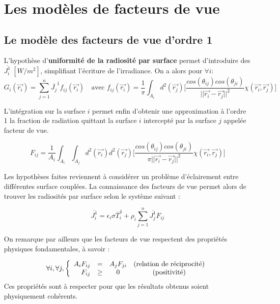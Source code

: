 \section{Les modèles de facteurs de vue}

\subsection{Le modèle des facteurs de vue d'ordre 1}
L'hypothèse d'\textbf{uniformité de la radiosité par surface} permet d'introduire des $\overline{J_i^1} \; [W/m^2]$, simplifiant l'écriture de l'irradiance. On a alors pour $\forall i$:
\begin{equation}
    G_i(\vec{r_i}) = \sum_{j = 1}^{n} \overline{J_j}^1 f_{ij}(\vec{r_i}) \quad \text{avec } f_{ij}(\vec{r_i}) =\frac{1}{\pi} \int_{A_i} d^2(\vec{r_j})\bigg[\frac{cos(\theta_{ij})cos(\theta_{ji})}{||\vec{r_i}-\vec{r_j}||^2} \chi{(\vec{r_i},\vec{r_j})}\bigg] 
\end{equation}

L'intégration sur la surface $i$ permet enfin d'obtenir une approximation à l'ordre 1 la fraction de radiation quittant la surface $i$ intercepté par la surface $j$ appelée facteur de vue.

\begin{equation}
    \label{fv}
    F_{ij} = \frac{1}{A_i} \int_{A_i} \int_{A_j} d^2(\vec{r_i}) d^2(\vec{r_j})\bigg[\frac{cos(\theta_{ij})cos(\theta_{ji})}{\pi ||\vec{r_i}-\vec{r_j}||^2} \chi(\vec{r_i},\vec{r_j})\bigg] 
\end{equation}


Les hypothèses faites reviennent à considérer un problème d'éclairement entre différentes surface couplées. La connaissance des facteurs de vue permet alors de trouver les radiosités par surface selon le système suivant : 

\begin{equation}
    \overline{J_i^1} = \epsilon_i \sigma \overline{T}^4_i  + \rho_i \sum_{j=1}^{n} \overline{J_j^1} F_{ij}
\end{equation}


On remarque par ailleurs que les facteurs de vue respectent des propriétés physiques fondamentales, à savoir :

\begin{equation}
    \forall i ,\forall j,  
    \left\lbrace
    \begin{array}{r c c c  }
    
      A_i F_{ij} & = & A_j F_{ji} & \text{(relation de réciprocité)}\\
      F_{ij} & \geq & 0 & \text{(positivité)}
    \end{array}\right.
    \label{def:fv}
\end{equation}
Ces propriétés sont à respecter pour que les résultats obtenus soient physiquement cohérents.

